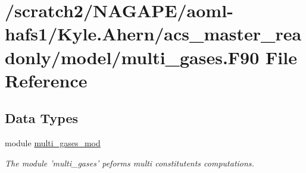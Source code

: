 \section{/scratch2/\-N\-A\-G\-A\-P\-E/aoml-\/hafs1/\-Kyle.Ahern/acs\-\_\-master\-\_\-readonly/model/multi\-\_\-gases.F90 File Reference}
\label{multi__gases_8F90}
\subsection*{Data Types}
\begin{DoxyCompactItemize}
\item 
module \hyperlink{classmulti__gases__mod}{multi\-\_\-gases\-\_\-mod}
\begin{DoxyCompactList}\small\item\em The module 'multi\-\_\-gases' peforms multi constitutents computations. \end{DoxyCompactList}\end{DoxyCompactItemize}
